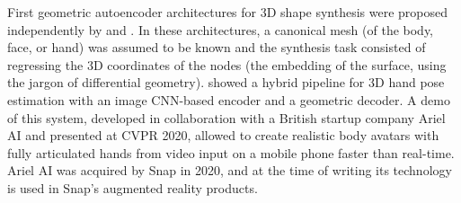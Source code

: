 First geometric autoencoder architectures for 3D shape synthesis were proposed independently by \cite{litany2018deformable} and  \cite{ranjan2018generating}. In these architectures, a canonical mesh (of the body, face, or hand) was assumed to be known and the synthesis task consisted of regressing the 3D coordinates of the nodes (the embedding of the surface, using the jargon of differential geometry). %
%
\cite{kulon2020weakly} showed a hybrid pipeline for 3D hand pose estimation with an image CNN-based encoder and a geometric decoder. A demo of this system, developed in collaboration with a British startup company Ariel AI and presented at CVPR 2020, allowed to create realistic body avatars with fully articulated hands from video input on a mobile phone faster than real-time.  %
Ariel AI was acquired by Snap in 2020, and at the time of writing its technology is used in Snap's augmented reality products. 
